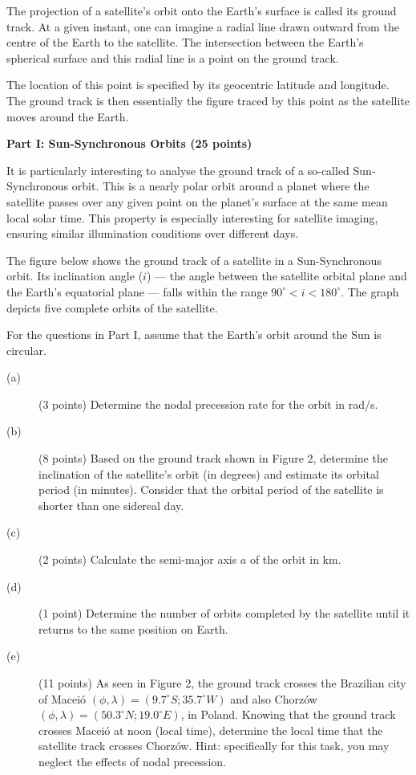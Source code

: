The projection of a satellite's orbit onto the Earth's surface is called its
ground track. At a given instant, one can imagine a radial line drawn outward
from the centre of the Earth to the satellite. The intersection between the
Earth's spherical surface and this radial line is a point on the ground track.

The location of this point is specified by its geocentric latitude and
longitude. The ground track is then essentially the figure traced by this
point as the satellite moves around the Earth.

\textbf{Part I: Sun-Synchronous Orbits (25 points)}

It is particularly interesting to analyse the ground track of a so-called
Sun-Synchronous orbit. This is a nearly polar orbit around a planet where the
satellite passes over any given point on the planet's surface at the same mean
local solar time. This property is especially interesting for satellite
imaging, ensuring similar illumination conditions over different days.

The figure below shows the ground track of a satellite in a Sun-Synchronous
orbit. Its inclination angle ($i$) --- the angle between the satellite orbital
plane and the Earth's equatorial plane --- falls within the range
$90^\circ < i < 180^\circ$. The graph depicts five complete orbits of the
satellite.

For the questions in Part I, assume that the Earth's orbit around the Sun is
circular.

\begin{description}
\item[(a)] (3 points) Determine the nodal precession rate for the orbit in
  rad/s.
\item[(b)] (8 points) Based on the ground track shown in Figure 2, determine
  the inclination of the satellite's orbit (in degrees) and estimate its
  orbital period (in minutes). Consider that the orbital period of the
  satellite is shorter than one sidereal day.
\item[(c)] (2 points) Calculate the semi-major axis $a$ of the orbit in km.
\item[(d)] (1 point) Determine the number of orbits completed by the satellite
  until it returns to the same position on Earth.
\item[(e)] (11 points) As seen in Figure 2, the ground track crosses the
  Brazilian city of Macei\'o
  $(\phi, \lambda) = (9.7^\circ S; 35.7^\circ W)$ and also Chorz\'ow
  $(\phi, \lambda) = (50.3^\circ N; 19.0^\circ E)$, in Poland. Knowing that
  the ground track crosses Macei\'o at noon (local time), determine the local
  time that the satellite track crosses Chorz\'ow. Hint: specifically for this
  task, you may neglect the effects of nodal precession.
\end{description}

